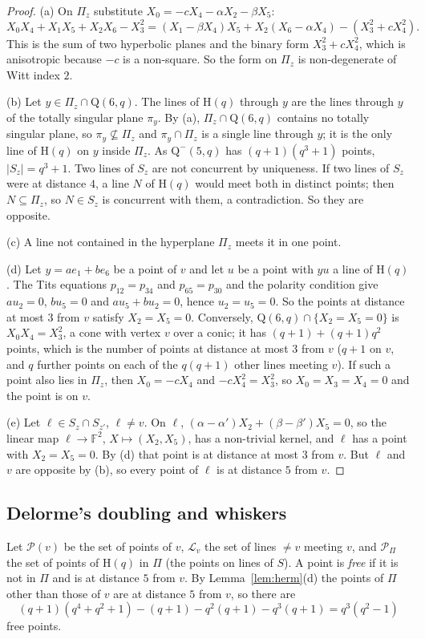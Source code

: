 \documentclass[11pt]{amsart}
\theoremstyle{definition}
\theoremstyle{remark}
\newcommand{\cP}{\mathcal{P}}
\newcommand{\cL}{\mathcal{L}}
\newcommand{\F}{\mathbb{F}}
\newcommand{\Hq}{\mathrm{H}}
\newcommand{\Qf}{\mathrm{Q}}
\begin{document}
\begin{proof}
(a) On $\Pi_z$ substitute $X_0=-cX_4-\alpha X_2-\beta X_5$:
\[
X_0X_4+X_1X_5+X_2X_6-X_3^2=(X_1-\beta X_4)X_5+X_2(X_6-\alpha X_4)-(X_3^2+cX_4^2).
\]
This is the sum of two hyperbolic planes and the binary form $X_3^2+cX_4^2$, which is anisotropic because $-c$ is a non-square. So the form on $\Pi_z$ is non-degenerate of Witt index $2$.

(b) Let $y\in\Pi_z\cap\Qf(6,q)$. The lines of $\Hq(q)$ through $y$ are the lines through $y$ of the totally singular plane $\pi_y$. By (a), $\Pi_z\cap\Qf(6,q)$ contains no totally singular plane, so $\pi_y\not\subseteq\Pi_z$ and $\pi_y\cap\Pi_z$ is a single line through $y$; it is the only line of $\Hq(q)$ on $y$ inside $\Pi_z$. As $\Qf^-(5,q)$ has $(q+1)(q^3+1)$ points, $|S_z|=q^3+1$. Two lines of $S_z$ are not concurrent by uniqueness. If two lines of $S_z$ were at distance $4$, a line $N$ of $\Hq(q)$ would meet both in distinct points; then $N\subseteq\Pi_z$, so $N\in S_z$ is concurrent with them, a contradiction. So they are opposite.

(c) A line not contained in the hyperplane $\Pi_z$ meets it in one point.

(d) Let $y=ae_1+be_6$ be a point of $v$ and let $u$ be a point with $yu$ a line of $\Hq(q)$. The Tits equations $p_{12}=p_{34}$ and $p_{65}=p_{30}$ and the polarity condition give $au_2=0$, $bu_5=0$ and $au_5+bu_2=0$, hence $u_2=u_5=0$. So the points at distance at most $3$ from $v$ satisfy $X_2=X_5=0$. Conversely, $\Qf(6,q)\cap\{X_2=X_5=0\}$ is $X_0X_4=X_3^2$, a cone with vertex $v$ over a conic; it has $(q+1)+(q+1)q^2$ points, which is the number of points at distance at most $3$ from $v$ ($q+1$ on $v$, and $q$ further points on each of the $q(q+1)$ other lines meeting $v$). If such a point also lies in $\Pi_z$, then $X_0=-cX_4$ and $-cX_4^2=X_3^2$, so $X_0=X_3=X_4=0$ and the point is on $v$.

(e) Let $\ell\in S_z\cap S_{z'}$, $\ell\ne v$. On $\ell$, $(\alpha-\alpha')X_2+(\beta-\beta')X_5=0$, so the linear map $\ell\to\F^2$, $X\mapsto(X_2,X_5)$, has a non-trivial kernel, and $\ell$ has a point with $X_2=X_5=0$. By (d) that point is at distance at most $3$ from $v$. But $\ell$ and $v$ are opposite by (b), so every point of $\ell$ is at distance $5$ from $v$.
\end{proof}

\subsection{Delorme's doubling and whiskers}
Let $\cP(v)$ be the set of points of $v$, $\cL_v$ the set of lines $\ne v$ meeting $v$, and $\cP_\Pi$ the set of points of $\Hq(q)$ in $\Pi$ (the points on lines of $S$). A point is \emph{free} if it is not in $\Pi$ and is at distance $5$ from $v$. By Lemma~\ref{lem:herm}(d) the points of $\Pi$ other than those of $v$ are at distance $5$ from $v$, so there are
\[
(q+1)(q^4+q^2+1)-(q+1)-q^2(q+1)-q^3(q+1)=q^3(q^2-1)
\]
free points.
\end{document}
